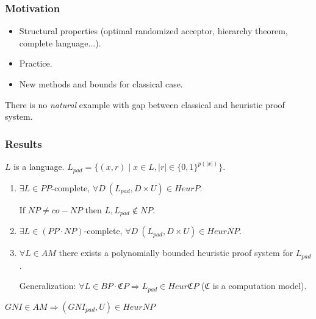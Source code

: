 \begin{frame}
    \frametitle{Motivation}

    \pause
    \begin{itemize}
	    \item Structural properties (optimal randomized acceptor,
		    hierarchy theorem, complete language...).
        \pause
    	\item Practice.
    	\pause
        \item New methods and bounds for classical case.
    \end{itemize}

    \begin{statement}
        There is no {\it natural} example with gap between classical and heuristic proof system.
    \end{statement}
\end{frame}

\begin{frame}
    \frametitle{Results}

    $L$ is a language.
    $L_{pad} = \{(x, r) \mid x \in L, |r| \in \{0, 1 \}^{p(|x|)}\}$.
    
    \pause
    \begin{enumerate}
		\item $\exists L \in PP$-complete, $\forall D~
    		(L_{pad}, D \times U) \in HeurP$.

            \pause
            If $NP \neq co-NP$ then $L, L_{pad} \notin NP$.
    	\pause
    	\item $\exists L \in (PP \cdot NP)$-complete, $\forall D~
		    (L_{pad}, D \times U) \in HeurNP$.

    	\pause
    	\item $\forall L \in AM$ there exists a polynomially bounded
    		heuristic proof system for $L_{pad}$.

            \pause
            
            \vspace{0.5cm}
            Generalization:
		    $\forall L \in BP \cdot \mathfrak{C}P \Rightarrow L_{pad}
            \in Heur\mathfrak{C}P$ ($\mathfrak{C}$ is a computation
            model).    
    \end{enumerate}

    \pause
    \begin{example}
        $GNI \in AM \Rightarrow (GNI_{pad}, U) \in HeurNP$
    \end{example}
\end{frame}

